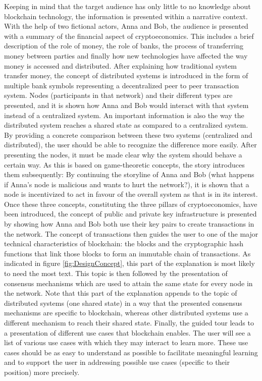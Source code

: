 Keeping in mind that the target audience has only little to no knowledge about blockchain technology, the information is presented within a narrative context. With the help of two fictional actors, Anna and Bob, the audience is presented with a summary of the financial aspect of cryptoeconomics. This includes a brief description of the role of money, the role of banks, the process of transferring money between parties and finally how new technologies have affected the way money is accessed and distributed. After explaining how traditional system transfer money, the concept of distributed systems is introduced in the form of multiple bank symbols representing a decentralized peer to peer transaction system. Nodes (participants in that network) and their different types are presented, and it is shown how Anna and Bob would interact with that system instead of a centralized system. An important information is also the way the distributed system reaches a shared state as compared to a centralized system. By providing a concrete comparison between these two systems (centralized and distributed), the user should be able to recognize the difference more easily. After presenting the nodes, it must be made clear why the system should behave a certain way. As this is based on game-theoretic concepts, the story introduces them subsequently: By continuing the storyline of Anna and Bob (what happens if Anna's node is malicious and wants to hurt the network?), it is shown that a node is incentivized to act in favour of the overall system as that is in its interest. Once these three concepts, constituting the three pillars of cryptoeconomics, have been introduced, the concept of public and private key infrastructure is presented by showing how Anna and Bob both use their key pairs to create transactions in the network. The concept of transactions then guides the user to one of the major technical characteristics of blockchain: the blocks and the cryptographic hash functions that link those blocks to form an immutable chain of transactions. As indicated in figure \ref{fig:DesignConcept}, this part of the explanation is most likely to need the most text. This topic is then followed by the presentation of consensus mechanisms which are used to attain the same state for every node in the network. Note that this part of the explanation appends to the topic of distributed systems (one shared state) in a way that the presented consensus mechanisms are specific to blockchain, whereas other distributed systems use a different mechanism to reach their shared state. Finally, the guided tour leads to a presentation of different use cases that blockchain enables. The user will see a list of various use cases with which they may interact to learn more. These use cases should be as easy to understand as possible to facilitate meaningful learning and to support the user in addressing possible use cases (specific to their position) more precisely.

